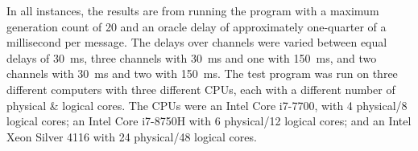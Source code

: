 In all instances, the results are from running the program with a maximum generation count of 20 and an oracle delay of approximately one-quarter of a millisecond per message.  The delays over channels were varied between equal delays of \qty{30}{\milli\second}, three channels with \qty{30}{\milli\second} and one with \qty{150}{\milli\second}, and two channels with \qty{30}{\milli\second} and two with \qty{150}{\milli\second}.  The test program was run on three different computers with three different CPUs, each with a different number of physical \& logical cores.  The CPUs were an Intel\textsuperscript{\textregistered} Core\textsuperscript{\texttrademark} i7-7700, with 4 physical/8 logical cores; an Intel\textsuperscript{\textregistered} Core\textsuperscript{\texttrademark} i7-8750H with 6 physical/12 logical cores; and an Intel\textsuperscript{\textregistered} Xeon\textsuperscript{\textregistered} Silver 4116 with 24 physical/48 logical cores.

\begin{table}
\centering
{}
\caption[Mean recorded running times for each  variant on an 8-core CPU]{Mean recorded running times in milliseconds for each \gls{nmp} variant in a simulation, with different sending delay lengths, on a computer with a CPU with 4/8 physical/logical cores}
\label{tab:nmp:simulation8cores}
\end{table}

